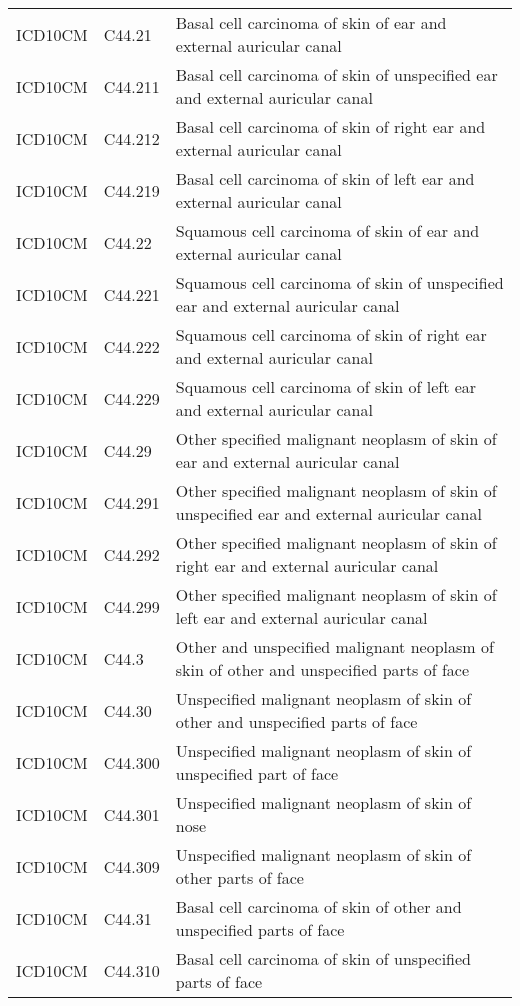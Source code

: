 \begin{longtable}{p{}p{}p{}}
  ICD10CM & C44.21 & Basal cell carcinoma of skin of ear and external auricular canal \\ 
  ICD10CM & C44.211 & Basal cell carcinoma of skin of unspecified ear and external auricular canal \\ 
  ICD10CM & C44.212 & Basal cell carcinoma of skin of right ear and external auricular canal \\ 
  ICD10CM & C44.219 & Basal cell carcinoma of skin of left ear and external auricular canal \\ 
  ICD10CM & C44.22 & Squamous cell carcinoma of skin of ear and external auricular canal \\ 
  ICD10CM & C44.221 & Squamous cell carcinoma of skin of unspecified ear and external auricular canal \\ 
  ICD10CM & C44.222 & Squamous cell carcinoma of skin of right ear and external auricular canal \\ 
  ICD10CM & C44.229 & Squamous cell carcinoma of skin of left ear and external auricular canal \\ 
  ICD10CM & C44.29 & Other specified malignant neoplasm of skin of ear and external auricular canal \\ 
  ICD10CM & C44.291 & Other specified malignant neoplasm of skin of unspecified ear and external auricular canal \\ 
  ICD10CM & C44.292 & Other specified malignant neoplasm of skin of right ear and external auricular canal \\ 
  ICD10CM & C44.299 & Other specified malignant neoplasm of skin of left ear and external auricular canal \\ 
  ICD10CM & C44.3 & Other and unspecified malignant neoplasm of skin of other and unspecified parts of face \\ 
  ICD10CM & C44.30 & Unspecified malignant neoplasm of skin of other and unspecified parts of face \\ 
  ICD10CM & C44.300 & Unspecified malignant neoplasm of skin of unspecified part of face \\ 
  ICD10CM & C44.301 & Unspecified malignant neoplasm of skin of nose \\ 
  ICD10CM & C44.309 & Unspecified malignant neoplasm of skin of other parts of face \\ 
  ICD10CM & C44.31 & Basal cell carcinoma of skin of other and unspecified parts of face \\ 
  ICD10CM & C44.310 & Basal cell carcinoma of skin of unspecified parts of face \\ 

\end{longtable}

